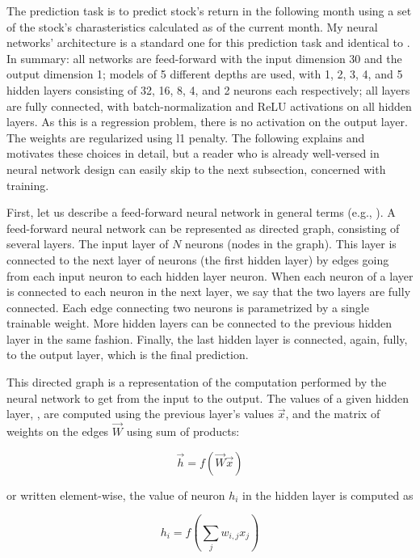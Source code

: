 	The prediction task is to predict stock's return in the following month using a set of the stock's charasteristics calculated as of the current month. My neural networks' architecture is a standard one for this prediction task and identical to \cite{gu2020empirical}. In summary: all networks are feed-forward with the input dimension 30 and the output dimension 1; models of 5 different depths are used, with 1, 2, 3, 4, and 5 hidden layers consisting of 32, 16, 8, 4, and 2 neurons each respectively; all layers are fully connected, with batch-normalization \citep{ioffe2015batch} and ReLU activations on all hidden layers. As this is a regression problem, there is no activation on the output layer. The weights are regularized using l1 penalty. The following explains and motivates these choices in detail, but a reader who is already well-versed in neural network design can easily skip to the next subsection, concerned with training. 
	
	First, let us describe a feed-forward neural network in general terms (e.g., \cite{goodfellow2016deep}). A feed-forward neural network can be represented as directed graph, consisting of several layers. The input layer of $N$ neurons (nodes in the graph). This layer is connected to the next layer of neurons (the first hidden layer) by edges going from each input neuron to each hidden layer neuron. When each neuron of a layer is connected to each neuron in the next layer, we say that the two layers are fully connected. Each edge connecting two neurons is parametrized by a single trainable weight. More hidden layers can be connected to the previous hidden layer in the same fashion. Finally, the last hidden layer is connected, again, fully, to the output layer, which is the final prediction.
	
	This directed graph is a representation of the computation performed by the neural network to get from the input to the output. The values of a given hidden layer, , are computed using the previous layer's values $\vec{x}$, and the matrix of weights on the edges $\vec{W}$ using sum of products: 
	
	\begin{equation}
		\vec{h} = f(\vec{W}\vec{x})
	\end{equation}
	
	or written element-wise, the value of neuron $h_i$ in the hidden layer is computed as 
	
	\begin{equation}
		h_i = f \left( \sum_{j}w_{i,j}x_j \right)
	\end{equation}
	
